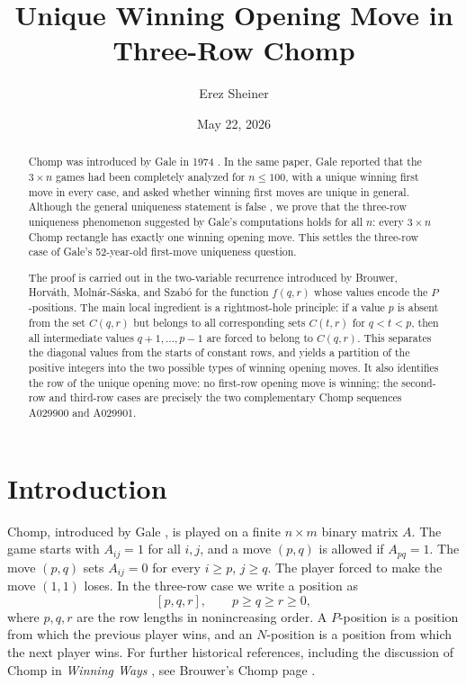 \documentclass[11pt]{article}
\title{Unique Winning Opening Move in Three-Row Chomp}
\author{Erez Sheiner}
\date{May 22, 2026}
\begin{document}
\maketitle


\begin{abstract}
Chomp was introduced by Gale in 1974 \cite{Gale1974}. In the same paper,
Gale reported that the $3\times n$ games had been completely analyzed for
$n\le 100$, with a unique winning first move in every case, and asked whether
winning first moves are unique in general. Although the general uniqueness
statement is false \cite[Section~7.1]{BrouwerEtAl2005}, we prove that the
three-row uniqueness phenomenon suggested by Gale's computations holds for
all $n$: every $3\times n$ Chomp rectangle has exactly one winning opening
move. This settles the three-row case of Gale's 52-year-old first-move
uniqueness question.

The proof is carried out in the two-variable recurrence introduced by
Brouwer, Horv\'ath, Moln\'ar-S\'aska, and Szab\'o \cite{BrouwerEtAl2005}
for the function $f(q,r)$ whose values encode the $P$-positions. The main
local ingredient is a rightmost-hole principle: if a value $p$ is absent from
the set $C(q,r)$ but belongs to all corresponding sets $C(t,r)$ for $q<t<p$,
then all intermediate values $q+1,\ldots,p-1$ are forced to belong to
$C(q,r)$. This separates the diagonal values from the starts of constant
rows, and yields a partition of the positive integers into the two possible
types of winning opening moves. It also identifies the row of the unique
opening move: no first-row opening move is winning; the second-row and
third-row cases are precisely the two complementary Chomp sequences A029900
and A029901.
\end{abstract}


\section{Introduction}

Chomp, introduced by Gale \cite{Gale1974}, is played on a finite
$n\times m$ binary matrix $A$. The game starts with $A_{ij}=1$ for all $i,j$,
and a move $(p,q)$ is allowed if $A_{pq}=1$. The move $(p,q)$ sets
$A_{ij}=0$ for every $i\ge p$, $j\ge q$. The player forced to make the move
$(1,1)$ loses. In the three-row case we write a position as
\[
        [p,q,r],\qquad p\ge q\ge r\ge 0,
\]
where $p,q,r$ are the row lengths in nonincreasing order. A $P$-position is a
position from which the previous player wins, and an $N$-position is a
position from which the next player wins. For further historical references,
including the discussion of Chomp in \emph{Winning Ways} \cite[p.~632]{WinningWays2003},
see Brouwer's Chomp page \cite{BrouwerChompPage}.
\end{document}
